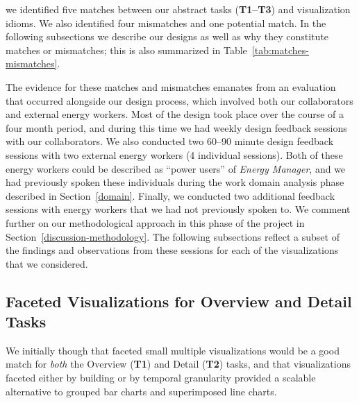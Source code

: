 \documentclass[journal]{vgtc}                %
\newcommand{\bstart}[1]{\vspace{1mm} \noindent{\textbf{#1:}}}
\begin{document}
\bstart{Matches \& mismatches} we identified five matches between our abstract tasks ({\bf T1--T3}) and visualization idioms. 
We also identified four mismatches and one potential match. 
In the following subsections we describe our designs as well as why they constitute matches or mismatches; this is also summarized in Table~\ref{tab:matches-mismatches}.

The evidence for these matches and mismatches emanates from an evaluation that occurred alongside our design process, which involved both our collaborators and external energy workers.
Most of the design took place over the course of a four month period, and during this time we had weekly design feedback sessions with our collaborators.
We also conducted two 60--90 minute design feedback sessions with two external energy workers (4 individual sessions).
Both of these energy workers could be described as ``power users'' of {\it Energy Manager}, and we had previously spoken these individuals during the work domain analysis phase described in Section~\ref{domain}.
Finally, we conducted two additional feedback sessions with energy workers that we had not previously spoken to.
We comment further on our methodological approach in this phase of the project in Section~\ref{discussion-methodology}. 
The following subsections reflect a subset of the findings and observations from these sessions for each of the visualizations that we considered.


\subsection{Faceted Visualizations for Overview and Detail Tasks}
\label{design-faceting}



We initially though that faceted small multiple visualizations would be a good match for {\it both} the Overview ({\bf T1}) and Detail ({\bf T2}) tasks, and that visualizations faceted either by building or by temporal granularity provided a scalable alternative to grouped bar charts and superimposed line charts.
\end{document}
